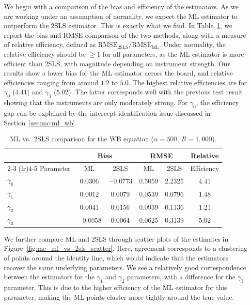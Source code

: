 We begin with a comparison of the bias and efficiency of the estimators. As we are working under an assumption of normality, we expect the ML estimator to outperform the 2SLS estimator. This is exactly what we find. In Table~\ref{tab:mc_comparison}, we report the bias and RMSE comparison of the two methods, along with a measure of relative efficiency, defined as $\text{RMSE}_{\text{2SLS}} / \text{RMSE}_{\text{ML}}$. Under normality, the relative efficiency should be $\geq 1$ for all parameters, as the ML estimator is more efficient than 2SLS, with magnitude depending on instrument strength. Our results show a lower bias for the ML estimator across the board, and relative efficiencies ranging from around $1.2$ to $5.0$. The highest relative efficiencies are for $\gamma_0$ ($4.41$) and $\gamma_3$ ($5.02$). The latter corresponds well with the previous test result showing that the instruments are only moderately strong. For $\gamma_0$, the efficiency gap can be explained by the intercept identification issue discussed in Section~\ref{sec:mc:ml_wb}.

\begin{table}[htbp]
\centering
\caption[ML vs.\ 2SLS comparison for the WB equation]{ML vs.\ 2SLS comparison for the WB equation ($n = 500$, $R = 1{,}000$).}
\label{tab:mc_comparison}
\begin{tabular}{lccccc}
\toprule
 & \multicolumn{2}{c}{Bias} & \multicolumn{2}{c}{RMSE} & Relative \\
\cmidrule(lr){2-3} \cmidrule(lr){4-5}
Parameter & ML & 2SLS & ML & 2SLS & Efficiency \\
\midrule
$\gamma_0$ & 0.0306 & $-0.0773$ & 0.5059 & 2.2325 & 4.41 \\
$\gamma_1$ & 0.0012 & 0.0079 & 0.0539 & 0.0796 & 1.48 \\
$\gamma_2$ & 0.0041 & 0.0156 & 0.0939 & 0.1136 & 1.21 \\
$\gamma_3$ & $-0.0058$ & 0.0064 & 0.0625 & 0.3139 & 5.02 \\
\bottomrule
\end{tabular}
\end{table}

We further compare ML and 2SLS through scatter plots of the estimates in Figure~\ref{fig:mc_ml_vs_2sls_scatter}. Here, agreement corresponds to a clustering of points around the identity line, which would indicate that the estimators recover the same underlying parameters. We see a relatively good correspondence between the estimators for the $\gamma_1$ and $\gamma_2$ parameters, with a difference for the $\gamma_3$ parameter. This is due to the higher efficiency of the ML estimator for this parameter, making the ML points cluster more tightly around the true value.

